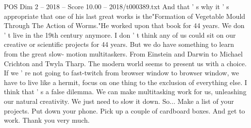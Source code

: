 \begin{textsample}{POS Dim 2 – 2018 – Score 10.00 – 2018/t000389.txt}
And that ' s why it ' s appropriate that one of his last great works is the"Formation of Vegetable Mould Through The Action of Worms."He worked upon that book for 44 years.
We don ' t live in the 19th century anymore.
I don ' t think any of us could sit on our creative or scientific projects for 44 years.
But we do have something to learn from the great slow- motion multitaskers.
From Einstein and Darwin to Michael Crichton and Twyla Tharp.
The modern world seems to present us with a choice.
If we ' re not going to fast-twitch from browser window to browser window, we have to live like a hermit, focus on one thing to the exclusion of everything else.
I think that ' s a false dilemma.
We can make multitasking work for us, unleashing our natural creativity.
We just need to slow it down.
So...
Make a list of your projects.
Put down your phone.
Pick up a couple of cardboard boxes.
And get to work.
Thank you very much.

\end{textsample}
